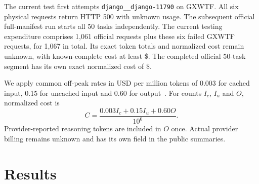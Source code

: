 \documentclass[10pt,a4paper]{article}
\begin{document}
The current test first attempts \texttt{django\_\_django-11790} on GXWTF.
All six physical requests return HTTP 500 with unknown usage. The subsequent
official full-manifest run starts all 50 tasks independently. The current
testing expenditure comprises 1,061 official requests plus these six failed
GXWTF requests, for 1,067 in total. Its exact token totals and normalized cost
remain unknown, with known-complete cost at least \$\LCost{}. The completed
official 50-task segment has its own exact normalized cost of \$\LCost{}.

We apply common off-peak rates in USD per million tokens of 0.003 for cached
input, 0.15 for uncached input and 0.60 for output~\cite{prices}. For counts
$I_c$, $I_u$ and $O$, normalized cost is
\begin{equation}
  C = \frac{0.003 I_c + 0.15 I_u + 0.60 O}{10^6}.
\label{eq:cost}
\end{equation}
Provider-reported reasoning tokens are included in $O$ once. Actual provider
billing remains unknown and has its own field in the public summaries.

\section{Results}
\end{document}
